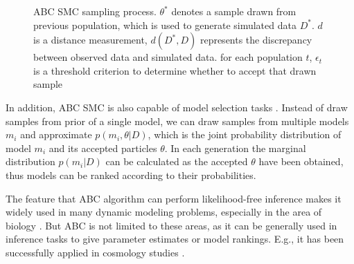 \begin{figure}[t]
    \begin{center}
    \end{center}

    \caption[ABC SMC sampling process]%
    {ABC SMC sampling process. $\theta^*$ denotes a sample drawn from previous population, which is used to generate simulated data $D^*$. $d$ is a distance measurement, $d(D^*,D)$ represents the discrepancy between observed data and simulated data. for each population $t$, $\epsilon_t$ is a threshold criterion to determine whether to accept that drawn sample}
    \label{fig:smc}

\end{figure}

In addition, ABC SMC is also capable of model selection tasks \cite{model_compare}. Instead of draw samples from prior of a single model, we can draw samples from multiple models $m_i$ and approximate $p(m_i, \theta|D)$, which is the joint probability distribution of model $m_i$ and its accepted particles $\theta$. In each generation the marginal distribution $p(m_i|D)$ can be calculated as the accepted ${\theta}$ have been obtained, thus models can be ranked according to their probabilities.

The feature that ABC algorithm can perform likelihood-free inference makes it widely used in many dynamic modeling problems, especially in the area of biology \cite{ref:abcsysbio, ref:disease, ref:compare}. But ABC is not limited to these areas, as it can be generally used in inference tasks to give parameter estimates or model rankings. E.g., it has been successfully applied in cosmology studies \cite{cosmology}.



